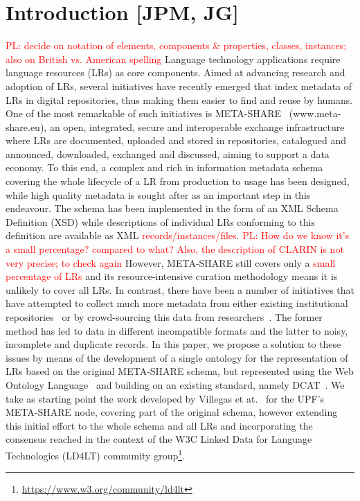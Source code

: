 \documentclass{llncs}
\begin{document}
\section{Introduction [JPM, JG]}
\label{sec:introduction}
\textcolor{red}{PL: decide on notation of elements, components \& properties, classes, instances; also on British vs. American spelling}
Language technology applications require language resources (LRs) as core components. Aimed at advancing research and adoption of LRs, several initiatives have recently emerged that index metadata of LRs in digital repositories, thus making them easier to find and reuse by humans. One of the most remarkable of such initiatives is META-SHARE~\cite{piperidis2012meta} (www.meta-share.eu), an open, integrated, secure and interoperable exchange infrastructure where LRs are documented, uploaded and stored in repositories, catalogued and announced, downloaded, exchanged and discussed, aiming to support a data economy. To this end, a complex and rich in information metadata schema covering the whole lifecycle of a LR from production to usage has been designed, while high quality metadata is sought after as an important step in this endeavour. The schema has been implemented in the form of an XML Schema Definition (XSD) while descriptions of individual LRs conforming to this definition are available as XML \textcolor{red}{records/instances/files}.
\textcolor{red}{PL: How do we know it's a small percentage? compared to what? Also, the description of CLARIN is not very precise; to check again}
However, META-SHARE still covers only a \textcolor{red}{small percentage of LRs} and its
resource-intensive curation methodology means it is unlikely to cover all
LRs. In contrast, there have been a number of initiatives that have
attempted to collect much more metadata from either existing institutional
repositories~\cite[CLARIN]{broeder2010data} or by crowd-sourcing this data from
researchers~\cite[LRE-Map]{calzolari2012lre}. The former method has led to
data in different incompatible formats and the latter to noisy, incomplete and
duplicate records.
In this paper, we propose a solution to these issues by means of the development
of a single ontology for the representation of LRs based on the
original META-SHARE schema, but represented using the Web Ontology
Language~\cite{motik2012owl} and building on an existing standard, namely
DCAT~\cite{maali2014data}.
We take as starting point the work developed by Villegas et at.~\cite{Villegas2014} for the UPF's META-SHARE node, covering part of the original schema, however extending this initial effort to the whole schema and all LRs and incorporating the consensus reached in the context of the W3C Linked Data for Language Technologies (LD4LT) community group\footnote{\url{https://www.w3.org/community/ld4lt}}.
\end{document}
